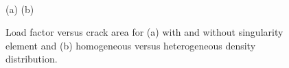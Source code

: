 \documentclass[onecolumn]{svjour3}
\begin{document}
\begin{figure}[h]
	\centering
	\begin{minipage}{.45\textwidth}
\end{minipage}%
\quad
\begin{minipage}{.45\textwidth}
\end{minipage} \\
(a)\hspace{5cm} (b)
	\caption{Load factor versus crack area for (a) with and without singularity element and (b) homogeneous versus heterogeneous density distribution.}
	\label{fig:load_factor1}
\end{figure}
\end{document}
